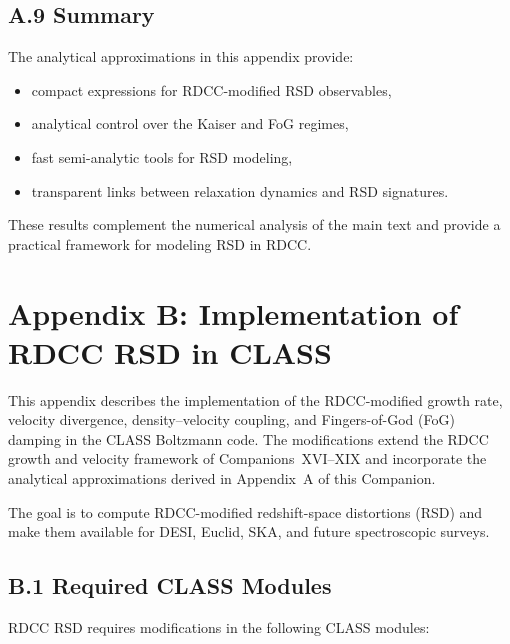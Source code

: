 \documentclass[11pt,a4paper]{article}
\begin{document}
\subsection*{A.9 Summary}

The analytical approximations in this appendix provide:
\begin{itemize}
\item compact expressions for RDCC-modified RSD observables,
\item analytical control over the Kaiser and FoG regimes,
\item fast semi-analytic tools for RSD modeling,
\item transparent links between relaxation dynamics and RSD signatures.
\end{itemize}

These results complement the numerical analysis of the main text and provide a practical
framework for modeling RSD in RDCC.

\section*{Appendix B: Implementation of RDCC RSD in CLASS}

This appendix describes the implementation of the RDCC-modified growth rate, velocity
divergence, density–velocity coupling, and Fingers-of-God (FoG) damping in the CLASS
Boltzmann code. The modifications extend the RDCC growth and velocity framework of
Companions~XVI–XIX and incorporate the analytical approximations derived in Appendix~A
of this Companion.

The goal is to compute RDCC-modified redshift-space distortions (RSD) and make them
available for DESI, Euclid, SKA, and future spectroscopic surveys.

\subsection*{B.1 Required CLASS Modules}

RDCC RSD requires modifications in the following CLASS modules:
\end{document}
